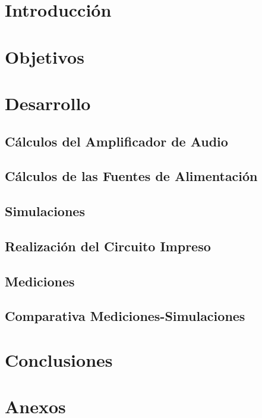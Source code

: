 \documentclass[12pt,a4paper]{article}
\begin{document}


\newpage
\thispagestyle{empty}
\tableofcontents
\newpage


\pagestyle{fancy}
\setcounter{page}{1}
\fancyfoot[R]{\thepage}


%

\section{Introducción}
\newpage
\section{Objetivos}

\newpage
\section{Desarrollo}

\subsection{Cálculos del Amplificador de Audio}

\subsection{Cálculos de las Fuentes de Alimentación}

\subsection{Simulaciones}

\subsection{Realización del Circuito Impreso}


\subsection{Mediciones}

\subsection{Comparativa Mediciones-Simulaciones}

\newpage
\section{Conclusiones}
\newpage
\section{Anexos}
\end{document}
